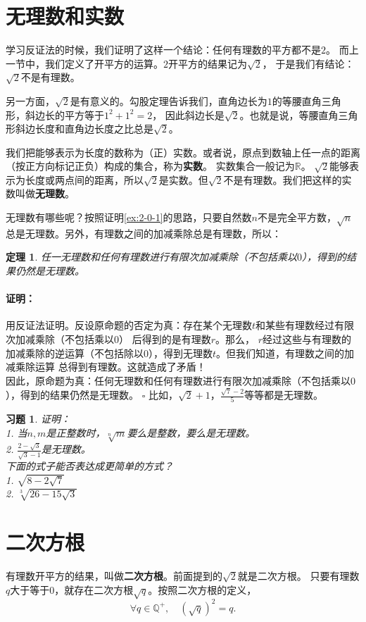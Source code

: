 \documentclass[12pt,UTF8]{ctexbook}
\newtheorem{tm}{定理}[section]
\newenvironment{proof2}{\paragraph{\textbf{证明：}}}{\hfill$\square$}
\newtheorem{xt}{习题}[section]
\begin{document}
\section{无理数和实数}
学习反证法的时候，我们证明了这样一个结论：任何有理数的平方都不是$2$。
而上一节中，我们定义了开平方的运算。$2$开平方的结果记为$\sqrt{2}$，
于是我们有结论：$\sqrt{2}$不是有理数。

另一方面，$\sqrt{2}$是有意义的。勾股定理告诉我们，直角边长为$1$的等腰直角三角形，斜边长的平方等于$1^2+1^2=2$，
因此斜边长是$\sqrt{2}$。也就是说，等腰直角三角形斜边长度和直角边长度之比总是$\sqrt{2}$。

我们把能够表示为长度的数称为（正）实数。或者说，原点到数轴上任一点的距离（按正方向标记正负）构成的集合，称为\textbf{实数}。
实数集合一般记为$\mathbb{R}$。
$\sqrt{2}$能够表示为长度或两点间的距离，所以$\sqrt{2}$是实数。但$\sqrt{2}$不是有理数。我们把这样的实数叫做\textbf{无理数}。

无理数有哪些呢？按照证明\ref{ex:2-0-1}的思路，只要自然数$n$不是完全平方数，$\sqrt{n}$总是无理数。另外，有理数之间的加减乘除总是有理数，所以：
\begin{tm}\label{tm:3-1-0}
    任一无理数和任何有理数进行有限次加减乘除（不包括乘以$0$），得到的结果仍然是无理数。
\end{tm}
\begin{proof2}
    用反证法证明。反设原命题的否定为真：存在某个无理数$t$和某些有理数经过有限次加减乘除（不包括乘以$0$）
    后得到的是有理数$r$。那么，
    $r$经过这些与有理数的加减乘除的逆运算（不包括除以$0$），得到无理数$t$。但我们知道，有理数之间的加减乘除运算
    总得到有理数。这就造成了矛盾！\\
    因此，原命题为真：任何无理数和任何有理数进行有限次加减乘除（不包括乘以$0$），得到的结果仍然是无理数。
\end{proof2}
比如，$\sqrt{2}+1$，$\frac{\sqrt{7} - 2}{5}$等等都是无理数。

\begin{xt}\label{xt:3-1-0}
    证明：\\
    1. 当$n,m$是正整数时，$\sqrt[n]{m}$要么是整数，要么是无理数。\\
    2. $\frac{2 - \sqrt{3}}{\sqrt{3} - 1}$是无理数。\\
    下面的式子能否表达成更简单的方式？\\
    1. $\sqrt{8 - 2\sqrt{7}}$\\
    2. $\sqrt[3]{26 - 15\sqrt{3}}$
\end{xt}

\section{二次方根}
有理数开平方的结果，叫做\textbf{二次方根}。前面提到的$\sqrt{2}$就是二次方根。
只要有理数$q$大于等于$0$，就存在二次方根$\sqrt{q}$。按照二次方根的定义，
$$\forall q\in\mathbb{Q}^+, \quad \left(\sqrt{q}\right)^2 = q.$$
\end{document}

